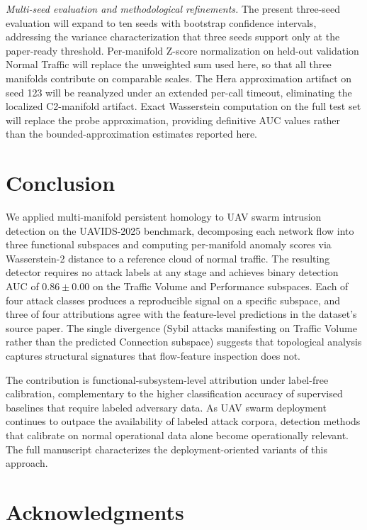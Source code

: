 \documentclass[conf]{new-aiaa}
\begin{document}
\textit{Multi-seed evaluation and methodological refinements.} The present three-seed evaluation will expand to ten seeds with bootstrap confidence intervals, addressing the variance characterization that three seeds support only at the paper-ready threshold. Per-manifold Z-score normalization on held-out validation Normal Traffic will replace the unweighted sum used here, so that all three manifolds contribute on comparable scales. The Hera approximation artifact on seed 123 will be reanalyzed under an extended per-call timeout, eliminating the localized C2-manifold artifact. Exact Wasserstein computation on the full test set will replace the probe approximation, providing definitive AUC values rather than the bounded-approximation estimates reported here.

\section{Conclusion}

We applied multi-manifold persistent homology to UAV swarm intrusion detection on the UAVIDS-2025 benchmark, decomposing each network flow into three functional subspaces and computing per-manifold anomaly scores via Wasserstein-2 distance to a reference cloud of normal traffic. The resulting detector requires no attack labels at any stage and achieves binary detection AUC of $0.86 \pm 0.00$ on the Traffic Volume and Performance subspaces. Each of four attack classes produces a reproducible signal on a specific subspace, and three of four attributions agree with the feature-level predictions in the dataset's source paper. The single divergence (Sybil attacks manifesting on Traffic Volume rather than the predicted Connection subspace) suggests that topological analysis captures structural signatures that flow-feature inspection does not.

The contribution is functional-subsystem-level attribution under label-free calibration, complementary to the higher classification accuracy of supervised baselines that require labeled adversary data. As UAV swarm deployment continues to outpace the availability of labeled attack corpora, detection methods that calibrate on normal operational data alone become operationally relevant. The full manuscript characterizes the deployment-oriented variants of this approach.

\section*{Acknowledgments}
\end{document}
